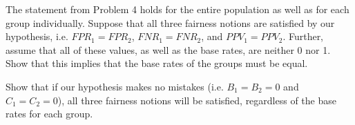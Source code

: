 \documentclass{cisXXX} %
\begin{document}
\HWproblem
The statement from Problem 4 holds for the entire population as well as for each group individually. Suppose that all three fairness notions are satisfied by our hypothesis, i.e. $FPR_1 = FPR_2$, $FNR_1 = FNR_2$, and $PPV_1 = PPV_2$. Further, assume that all of these values, as well as the base rates, are neither 0 nor 1. Show that this implies that the base rates of the groups must be equal.

\HWproblem
Show that if our hypothesis makes no mistakes (i.e. $B_1 = B_2 = 0$ and $C_1 = C_2 = 0$), all three fairness notions will be satisfied, regardless of the base rates for each group.
\end{document}
